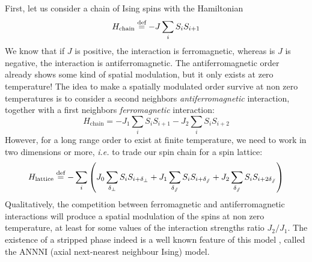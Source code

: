 First, let us consider a chain of Ising spins with the Hamiltonian
\begin{equation}
H_{\text{chain}}  \overset{\text{def}}{=}  - J \sum_i S_i S_{i+1}
\end{equation}
We know that if $J$ is positive, the interaction is ferromagnetic, whereas is $J$ is negative, the interaction is antiferromagnetic. 
The antiferromagnetic order already shows some kind of spatial modulation, but it only exists at zero temperature! 
The idea to make a spatially modulated order survive at non zero temperatures is to consider a second neighbors \textit{antiferromagnetic} interaction, together with a first neighbors \textit{ferromagnetic} interaction:
\begin{equation}
H_{\text{chain}} = - J_1 \sum_i S_i S_{i+1} - J_2 \sum_i S_i S_{i+2}
\end{equation}
However, for a long range order to exist at finite temperature, we need to work in two dimensions or more, \textit{i.e.} to trade our spin chain for a spin lattice:
 \begin{equation}
 H_{\text{lattice}}  \overset{\text{def}}{=}  - \sum_i \left( J_0 \sum_{\delta_\perp} S_i S_{i+\delta_\perp} + J_1 \sum_{\delta_\sslash} S_i S_{i+\delta_\sslash} + J_2 \sum_{\delta_\sslash} S_i S_{i+2 \delta_\sslash} \right)
 \end{equation}
 Qualitatively, the competition between ferromagnetic and antiferromagnetic interactions will produce a spatial modulation of the spins at non zero temperature, at least for some values of the interaction strengths ratio $J_2/J_1$. 
 The existence of a stripped phase indeed is a well known feature of this model \cite{ANNNI}, called the ANNNI (axial next-nearest neighbour Ising) model.
 

